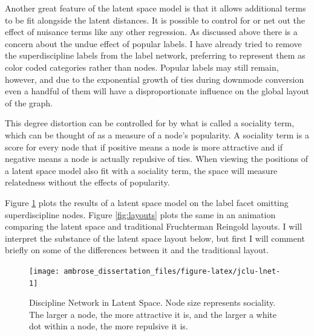 \documentclass[]{book}
\theoremstyle{definition}
\theoremstyle{definition}
\theoremstyle{definition}
\theoremstyle{remark}
\begin{document}
Another great feature of the latent space model is that it allows
additional terms to be fit alongside the latent distances. It is
possible to control for or net out the effect of nuisance terms like any
other regression. As discussed above there is a concern about the undue
effect of popular labels. I have already tried to remove the
superdiscipline labels from the label network, preferring to represent
them as color coded categories rather than nodes. Popular labels may
still remain, however, and due to the exponential growth of ties during
downmode conversion even a handful of them will have a disproportionate
influence on the global layout of the graph.

This degree distortion can be controlled for by what is called a
sociality term, which can be thought of as a measure of a node's
popularity. A sociality term is a score for every node that if positive
means a node is more attractive and if negative means a node is actually
repulsive of ties. When viewing the positions of a latent space model
also fit with a sociality term, the space will measure relatedness
without the effects of popularity.

Figure \ref{fig:jclu-lnet} plots the results of a latent space model on
the label facet omitting superdiscipline nodes. Figure \ref{fig:layouts}
plots the same in an animation comparing the latent space and
traditional Fruchterman Reingold layouts. I will interpret the substance
of the latent space layout below, but first I will comment briefly on
some of the differences between it and the traditional layout.

\begin{figure}

{\centering \texttt{[image: ambrose\_dissertation\_files/figure-latex/jclu-lnet-1]} 

}

\caption[Discipline Network in Latent Space.]{Discipline Network in Latent Space. Node size represents sociality. The larger a node, the more attractive it is, and the larger a white dot within a node, the more repulsive it is.}\label{fig:jclu-lnet}
\end{figure}
\end{document}
